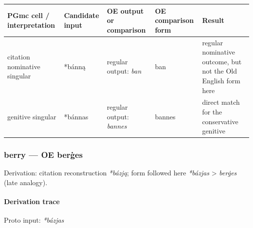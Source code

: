 \documentclass[
  british,
  a4paper,
]{article}
\newcounter{none} %
\begin{document}
{\def\LTcaptype{none} %
\begin{longtable}[]{@{}
  >{\raggedright\arraybackslash}p{}
  >{\raggedright\arraybackslash}p{}
  >{\raggedright\arraybackslash}p{}
  >{\raggedright\arraybackslash}p{}
  >{\raggedright\arraybackslash}p{}@{}}
\toprule\noalign{}
\begin{minipage}[b]{\linewidth}\raggedright
PGmc cell / interpretation
\end{minipage} & \begin{minipage}[b]{\linewidth}\raggedright
Candidate input
\end{minipage} & \begin{minipage}[b]{\linewidth}\raggedright
OE output or comparison
\end{minipage} & \begin{minipage}[b]{\linewidth}\raggedright
OE comparison form
\end{minipage} & \begin{minipage}[b]{\linewidth}\raggedright
Result
\end{minipage} \\
\midrule\noalign{}
\endhead
\bottomrule\noalign{}
\endlastfoot
citation nominative singular & *bánną & regular output: \emph{ban} & ban
& regular nominative outcome, but not the Old English form here \\
genitive singular & *bánnas & regular output: \emph{bannes} & bannes &
direct match for the conservative genitive \\
\end{longtable}
}

\subsubsection{berry --- OE berġes}\label{berry-oe-berux121es}

Derivation: citation reconstruction \emph{*bázją}; form followed here
\emph{*bázjas} \textgreater{} \emph{berġes} (late analogy).

\paragraph{Derivation trace}\label{derivation-trace-40}

Proto input: \emph{*bázjas}
\end{document}
